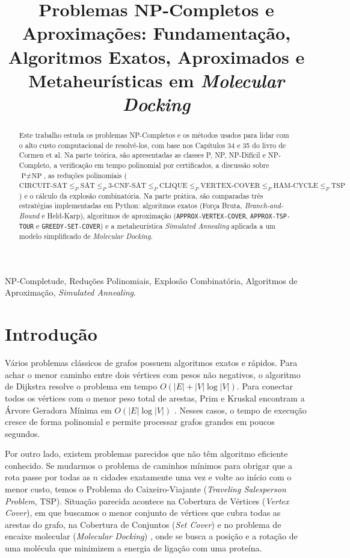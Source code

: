 \documentclass[conference]{IEEEtran}
\title{Problemas NP-Completos e Aproximações: Fundamentação, Algoritmos Exatos, Aproximados e Metaheurísticas em \textit{Molecular Docking}}
\author{
\IEEEauthorblockN{Igor, Maria Eduarda, Kairo Henrique, Heitor Henrique e Jade Souza}
\IEEEauthorblockA{Departamento de Computação e Mecânica (DECOM-DV) -- CEFET-MG, Divinópolis, MG \\
Estratégias Avançadas de Projeto e Análise de Algoritmos (Prof. Michel Pires da Silva)}
}
\theoremstyle{definition}
\theoremstyle{plain}
\begin{document}
\maketitle

\begin{abstract}
Este trabalho estuda os problemas NP-Completos e os métodos usados para lidar com o alto custo computacional de resolvê-los, com base nos Capítulos 34 e 35 do livro de Cormen et al. Na parte teórica, são apresentadas as classes P, NP, NP-Difícil e NP-Completo, a verificação em tempo polinomial por certificados, a discussão sobre $\text{P} \neq \text{NP}$, as reduções polinomiais ($\text{CIRCUIT-SAT} \le_P \text{SAT} \le_P \text{3-CNF-SAT} \le_P \text{CLIQUE} \le_P \text{VERTEX-COVER} \le_P \text{HAM-CYCLE} \le_P \text{TSP}$) e o cálculo da explosão combinatória. Na parte prática, são comparadas três estratégias implementadas em Python: algoritmos exatos (Força Bruta, \textit{Branch-and-Bound} e Held-Karp), algoritmos de aproximação (\texttt{APPROX-VERTEX-COVER}, \texttt{APPROX-TSP-TOUR} e \texttt{GREEDY-SET-COVER}) e a metaheurística \textit{Simulated Annealing} aplicada a um modelo simplificado de \textit{Molecular Docking}.
\end{abstract}

\begin{IEEEkeywords}
NP-Completude, Reduções Polinomiais, Explosão Combinatória, Algoritmos de Aproximação, \textit{Simulated Annealing}.
\end{IEEEkeywords}

\section{Introdução}
\label{sec:introducao}

Vários problemas clássicos de grafos possuem algoritmos exatos e rápidos. Para achar o menor caminho entre dois vértices com pesos não negativos, o algoritmo de Dijkstra resolve o problema em tempo $O(|E| + |V|\log|V|)$. Para conectar todos os vértices com o menor peso total de arestas, Prim e Kruskal encontram a Árvore Geradora Mínima em $O(|E|\log|V|)$ \cite{cormen2012algoritmos}. Nesses casos, o tempo de execução cresce de forma polinomial e permite processar grafos grandes em poucos segundos.

Por outro lado, existem problemas parecidos que não têm algoritmo eficiente conhecido. Se mudarmos o problema de caminhos mínimos para obrigar que a rota passe por todas as $n$ cidades exatamente uma vez e volte ao início com o menor custo, temos o Problema do Caixeiro-Viajante (\textit{Traveling Salesperson Problem}, TSP). Situação parecida acontece na Cobertura de Vértices (\textit{Vertex Cover}), em que buscamos o menor conjunto de vértices que cubra todas as arestas do grafo, na Cobertura de Conjuntos (\textit{Set Cover}) e no problema de encaixe molecular (\textit{Molecular Docking}) \cite{pagadala2017software,huang2018comprehensive}, onde se busca a posição e a rotação de uma molécula que minimizem a energia de ligação com uma proteína.
\end{document}
